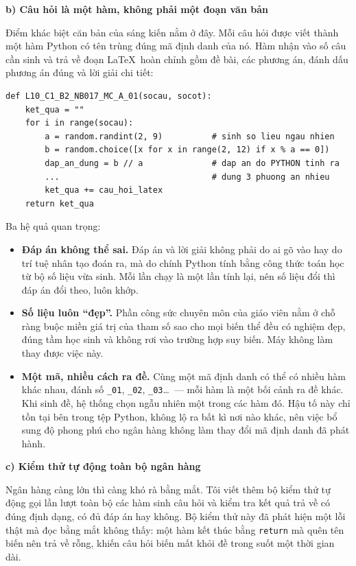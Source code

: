 \textbf{b) Câu hỏi là một hàm, không phải một đoạn văn bản}

Điểm khác biệt căn bản của sáng kiến nằm ở đây. Mỗi câu hỏi được viết thành một
hàm Python có tên trùng đúng mã định danh của nó. Hàm nhận vào số câu cần sinh
và trả về đoạn \LaTeX\ hoàn chỉnh gồm đề bài, các phương án, đánh dấu phương án
đúng và lời giải chi tiết:

\begin{lstlisting}
def L10_C1_B2_NB017_MC_A_01(socau, socot):
    ket_qua = ""
    for i in range(socau):
        a = random.randint(2, 9)          # sinh so lieu ngau nhien
        b = random.choice([x for x in range(2, 12) if x % a == 0])
        dap_an_dung = b // a              # dap an do PYTHON tinh ra
        ...                               # dung 3 phuong an nhieu
        ket_qua += cau_hoi_latex
    return ket_qua
\end{lstlisting}

Ba hệ quả quan trọng:

\begin{itemize}[leftmargin=1.2cm, itemsep=3pt]
  \item \textbf{Đáp án không thể sai.} Đáp án và lời giải không phải do ai gõ
        vào hay do trí tuệ nhân tạo đoán ra, mà do chính Python tính bằng công
        thức toán học từ bộ số liệu vừa sinh. Mỗi lần chạy là một lần tính
        lại, nên số liệu đổi thì đáp án đổi theo, luôn khớp.
  \item \textbf{Số liệu luôn ``đẹp''.} Phần công sức chuyên môn của giáo viên
        nằm ở chỗ ràng buộc miền giá trị của tham số sao cho mọi biến thể đều
        có nghiệm đẹp, đúng tầm học sinh và không rơi vào trường hợp suy biến.
        Máy không làm thay được việc này.
  \item \textbf{Một mã, nhiều cách ra đề.} Cùng một mã định danh có thể có
        nhiều hàm khác nhau, đánh số \texttt{\_01}, \texttt{\_02},
        \texttt{\_03}\dots\ --- mỗi hàm là một bối cảnh ra đề khác. Khi sinh
        đề, hệ thống chọn ngẫu nhiên một trong các hàm đó. Hậu tố này chỉ tồn
        tại bên trong tệp Python, không lộ ra bất kì nơi nào khác, nên việc bổ
        sung độ phong phú cho ngân hàng không làm thay đổi mã định danh đã
        phát hành.
\end{itemize}

\textbf{c) Kiểm thử tự động toàn bộ ngân hàng}

Ngân hàng càng lớn thì càng khó rà bằng mắt. Tôi viết thêm bộ kiểm thử tự động
gọi lần lượt toàn bộ các hàm sinh câu hỏi và kiểm tra kết quả trả về có đúng
định dạng, có đủ đáp án hay không. Bộ kiểm thử này đã phát hiện một lỗi thật mà
đọc bằng mắt không thấy: một hàm kết thúc bằng \texttt{return} mà quên tên biến
nên trả về rỗng, khiến câu hỏi biến mất khỏi đề trong suốt một thời gian dài.

